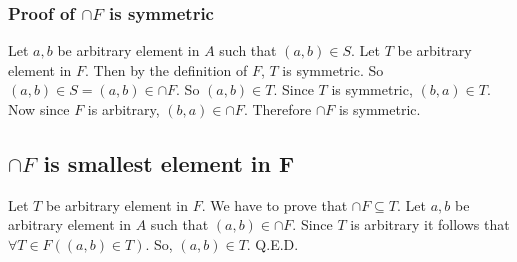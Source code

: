 \documentclass{article}
\begin{document}
\subsubsection{Proof of $\cap F$ is symmetric}
Let $a,b$ be arbitrary element in $A$ such that $(a,b) \in S$. Let $T$
be arbitrary element in $F$. Then by the definition of $F$, $T$ is
symmetric. So $(a,b) \in S = (a,b) \in \cap F$. So $(a,b) \in T$.
Since $T$ is symmetric, $(b,a) \in T$. Now since $F$ is arbitrary,
$(b,a) \in \cap F$. Therefore $\cap F$ is symmetric.

\subsection{$\cap F$ is smallest element in F}
Let $T$ be arbitrary element in $F$. We have to prove that $\cap F
\subseteq T$. Let $a,b$ be arbitrary element in $A$ such that $(a,b)
\in \cap F$. Since $T$ is arbitrary it follows that $\forall T \in
F((a,b) \in T)$. So, $(a,b) \in T$. Q.E.D.
\end{document}

